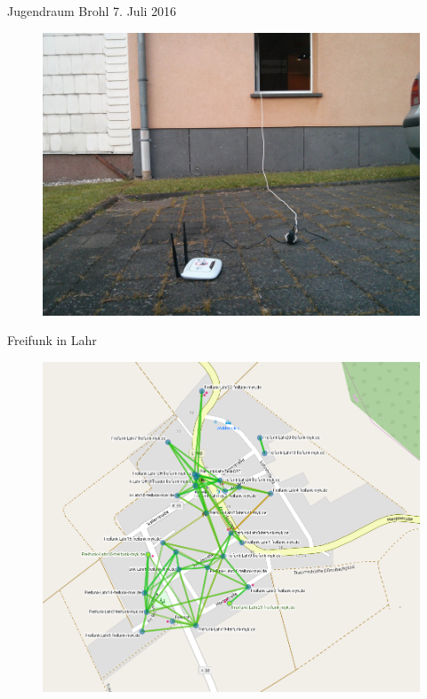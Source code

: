 \documentclass{beamer}
\begin{document}
\begin{frame}{Jugendraum Brohl 7. Juli 2016}
\begin{figure} 
\centering
\includegraphics[width=0.8\linewidth]{Bilder/Brohl2016-7-7}
\label{fig:brohl-7}
\end{figure}
\end{frame}



\begin{frame}{Freifunk in Lahr}

\begin{figure}
	\centering
	\includegraphics[width=0.7\linewidth]{Bilder/Lahr}
	\caption{}
	\label{fig:lahr}
\end{figure}

\end{frame}
\end{document}
